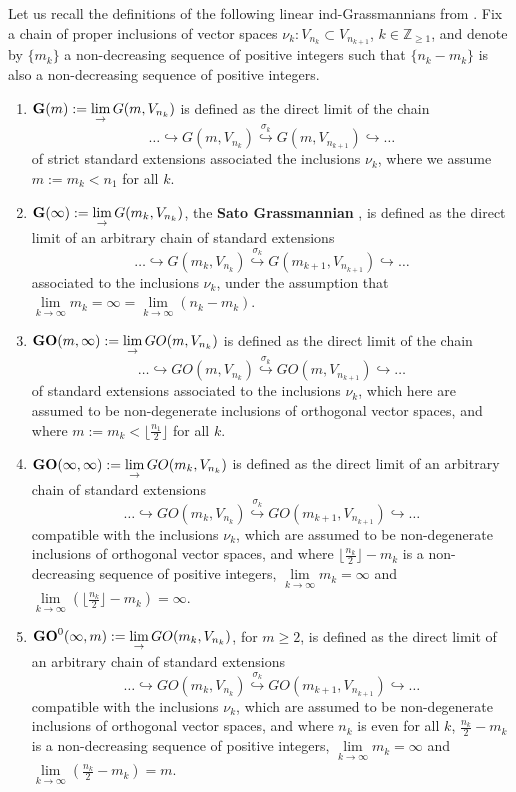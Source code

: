 \documentclass[12pt]{amsart}
\def\ZZ {{\mathbb Z}}     %
\begin{document}
Let us recall the definitions of the following linear ind-Grassmannians from \cite{Penkov-Tikhomirov-Lin-ind-Grass}. Fix a chain of proper inclusions of vector spaces $\nu_k:V_{n_k}\subset V_{n_{k+1}}$, $k\in\ZZ_{\geq 1}$, and denote by $\{m_k\}$ a non-decreasing sequence of positive integers such that $\{n_k - m_k\}$ is also a non-decreasing sequence of positive integers.
\begin{enumerate}
\item[{\rm (A)}] ${\bf G}(m):=\lim\limits_{\to} G(m,V_{n_k})$ is defined as the direct limit of the chain
$$
\dots \hookrightarrow G(m,V_{n_k}) \stackrel{\sigma_k}{\hookrightarrow} G(m,V_{n_{k+1}}) \hookrightarrow \dots
$$
of strict standard extensions associated the inclusions $\nu_k$, where we assume $m:= m_k < n_1$ for all $k$.
\item[{\rm (B)}] ${\bf G}(\infty):=\lim\limits_{\to} G(m_k,V_{n_k})$, the {\bf Sato Grassmannian} \cite{Sato}, is defined as the direct limit of an arbitrary chain of standard extensions
$$
\dots \hookrightarrow G(m_k,V_{n_k}) \stackrel{\sigma_k}{\hookrightarrow} G(m_{k+1},V_{n_{k+1}}) \hookrightarrow \dots
$$
associated to the inclusions $\nu_k$, under the assumption that $\lim\limits_{k\to \infty} m_k=\infty=\lim\limits_{k\to\infty} (n_k-m_k)$.

\item[{\rm (C)}] ${\bf GO}(m,\infty):=\lim\limits_{\to} GO(m,V_{n_k})$ is defined as the direct limit of the chain
$$
\dots \hookrightarrow GO(m,V_{n_k}) \stackrel{\sigma_k}{\hookrightarrow} GO(m,V_{n_{k+1}}) \hookrightarrow \dots
$$
of standard extensions associated to the inclusions $\nu_k$, which here are assumed to be non-degenerate inclusions of orthogonal vector spaces, and where $m:= m_k< \lfloor \frac{n_1}{2}\rfloor$ for all $k$.

\item[{\rm (D)}] ${\bf GO}(\infty,\infty):=\lim\limits_{\to} GO(m_k,V_{n_k})$ is defined as the direct limit of an arbitrary chain of standard extensions
$$
\dots \hookrightarrow GO(m_k,V_{n_k}) \stackrel{\sigma_k}{\hookrightarrow} GO(m_{k+1},V_{n_{k+1}}) \hookrightarrow \dots
$$
compatible with the inclusions $\nu_k$, which are assumed to be non-degenerate inclusions of orthogonal vector spaces, and where $\lfloor \frac{n_k}{2}\rfloor-m_k$ is a non-decreasing sequence of positive integers, $\lim\limits_{k\to\infty} m_k=\infty$ and $\lim\limits_{k\to\infty} (\lfloor \frac{n_k}{2}\rfloor-m_k)=\infty$.

\item[{\rm (E)}] ${\bf GO}^0(\infty,m):=\lim\limits_{\to} GO(m_k,V_{n_k})$, for $m\geq 2$, is defined as the direct limit of an arbitrary chain of standard extensions
$$
\dots \hookrightarrow GO(m_k,V_{n_k}) \stackrel{\sigma_k}{\hookrightarrow} GO(m_{k+1},V_{n_{k+1}}) \hookrightarrow \dots
$$
compatible with the inclusions $\nu_k$, which are assumed to be non-degenerate inclusions of orthogonal vector spaces, and where $n_k$ is even for all $k$, $\frac{n_k}{2}-m_k$ is a non-decreasing sequence of positive integers, $\lim\limits_{k\to\infty} m_k=\infty$ and $\lim\limits_{k\to\infty} (\frac{n_k}{2}-m_k)=m$.


\end{enumerate}
\end{document}
